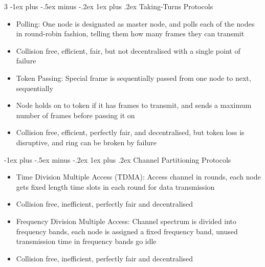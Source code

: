 \documentclass[10pt, landscape]{article}
\makeatletter
\renewcommand{\subsection}{\@startsection{subsection}{3}{0mm}%
                                {-1ex plus -.5ex minus -.2ex}%
                                {1ex plus .2ex}%
                                {\normalfont\small\bfseries}}%
\makeatother
\begin{document}
\begin{multicols*}{3}
\subsection{Taking-Turns Protocols}
\begin{itemize}
    \item Polling: One node is designated as master node, and polls each of the nodes in round-robin fashion, telling them how many frames they can transmit
    \item Collision free, efficient, fair, but not decentralised with a single point of failure
    \item Token Passing: Special frame is sequentially passed from one node to next, sequentially
    \item Node holds on to token if it has frames to transmit, and sends a maximum number of frames before passing it on
    \item Collision free, efficient, perfectly fair, and decentralised, but token loss is disruptive, and ring can be broken by failure
\end{itemize}
\subsection{Channel Partitioning Protocols}
\begin{itemize}
    \item Time Division Multiple Access (TDMA): Access channel in rounds, each node gets fixed length time slots in each round for data transmission
    \item Collision free, inefficient, perfectly fair and decentralised
    \item Frequency Division Multiple Access: Channel spectrum is divided into frequency bands, each node is assigned a fixed frequency band, unused transmission time in frequency bands go idle
    \item Collision free, inefficient, perfectly fair and decentralised
\end{itemize}


\end{multicols*}
\end{document}
